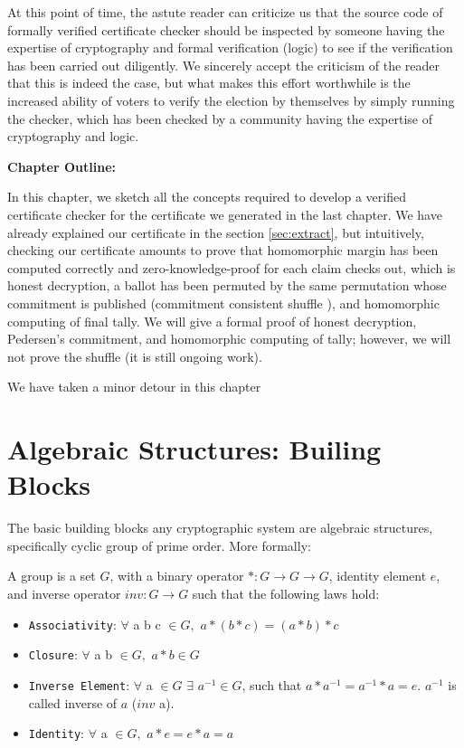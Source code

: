   
  
  At this point of time, the astute reader can criticize us that the source code of formally verified certificate checker should be 
  inspected by someone having the expertise of cryptography and formal verification (logic) 
  to see if the verification has been carried out diligently. We sincerely accept the criticism of the 
  reader that this is indeed the case, but what makes this effort  worthwhile is 
  the increased ability of voters to verify the election by themselves by 
  simply running the checker, which has been checked by a community having the 
  expertise of cryptography and logic. 

\textbf{Chapter Outline:} 



In this chapter, we sketch all the concepts required to develop a verified certificate checker for the certificate we generated 
in the last chapter.  We have already explained our certificate in the section \ref{sec:extract}, but intuitively, 
checking our certificate amounts to prove that  homomorphic margin has been computed correctly and zero-knowledge-proof for each claim checks out, which is honest decryption, 
a ballot has been permuted by the same permutation whose commitment is published (commitment consistent shuffle \citep{Wikstrom:2009:CPS}), and 
homomorphic computing of final tally.  We will give a formal proof of honest decryption, Pedersen's commitment, and homomorphic computing of 
tally; however, we will not prove the  shuffle (it is still ongoing work).  

We have taken a minor detour in this chapter 



\section{Algebraic Structures: Builing Blocks}
The basic building blocks any cryptographic system are algebraic structures, specifically cyclic group of prime order. More formally:

\begin{definition}[Group] 
A group is a set $G$, with a binary operator $* : G \rightarrow G \rightarrow G$, identity element $e$, and inverse operator $inv : G \rightarrow G$ such 
    that the following laws hold:  \end{definition} 
    \begin{itemize}
     \item \texttt{Associativity}: $\forall$  a b c $\in G,$  $a * (b * c) = (a * b) * c$
    \item \texttt{Closure}: $\forall$ a b $\in G,$  $a * b \in G$
    \item \texttt{Inverse Element}: $\forall$ a $\in G$ $\exists$ $a^{-1} \in G$, such that $a * a^{-1} = a^{-1} * a = e$. $a^{-1}$ is called inverse of $a$ ($inv$ a).
    \item \texttt{Identity}: $\forall$ a $\in G,$  $a * e = e * a  = a$
    \end{itemize}
  
